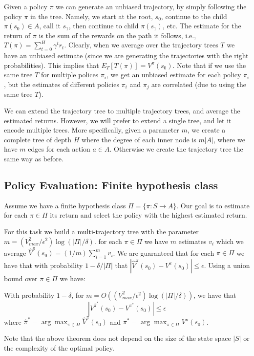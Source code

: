 Given a policy $\pi$ we can generate an unbiased trajectory, by
simply following the policy $\pi$ in the tree. Namely, we start at
the root, $s_0$, continue to the child $\pi(s_0)\in A$, call it
$s_1$, then continue to child $\pi(s_1)$, etc. The estimate for the
return of $\pi$ is the sum of the rewards on the path it follows,
i.e., $T(\pi)=\sum_{t=0}^H \gamma^t r_t$. Clearly, when we average
over the trajectory trees $T$ we have an unbiased estimate (since we
are generating the trajectories with the right probabilities). This
implies that $E_T [T(\pi)]=V^\pi(s_0)$. Note that if we use the same
tree $T$ for multiple polices $\pi_i$, we get an unbiased estimate
for each policy $\pi_i$, but the estimates of different policies
$\pi_i$ and $\pi_j$ are correlated (due to using the same tree $T$).

We can extend the trajectory tree to multiple trajectory trees, and
average the estimated returns. However, we will prefer to extend a
single tree, and let it encode multiple trees. More specifically,
given a parameter $m$, we create a complete tree of depth $H$ where
the degree of each inner node is $m|A|$, where we have $m$ edges for
each action $a\in A$. Otherwise we create the trajectory tree the
same way as before.

\subsection{Policy Evaluation: Finite hypothesis class}

Assume we have a finite hypothesis class $\Pi=\{\pi:S\rightarrow
A\}$. Our goal is to estimate for each $\pi\in \Pi$ its return and
select the policy with the highest estimated return.

For this task we build a multi-trajectory tree with the parameter
$m=(V^2_{max} /\epsilon^2)\log (|\Pi|/\delta)$. for each $\pi\in
\Pi$ we have $m$ estimates $v_i$ which we average
$\hat{V}^\pi(s_0)=(1/m)\sum_{i=1}^m v_i$. We are guaranteed that for
each $\pi\in \Pi$ we have that with probability $1-\delta/|\Pi|$
that $|\hat{V}^\pi(s_0)-V^\pi(s_0)|\leq \epsilon$. Using a union
bound over $\pi\in \Pi$ we have:

\begin{theorem}
With probability $1-\delta$, for $m=O((V^2_{max} /\epsilon^2)\log
(|\Pi|/\delta))$, we have that
\[
|V^{\hat{\pi}^*}(s_0)-V^{\pi^*}(s_0)|\leq \epsilon
\]
where $\hat{\pi}^*=\arg\max_{\pi\in\Pi} \hat{V}^\pi(s_0)$ and
$\pi^*=\arg\max_{\pi\in\Pi} V^\pi(s_0)$.
\end{theorem}
Note that the above theorem does not depend on the size of the state
space $|S|$ or the complexity of the optimal policy.

